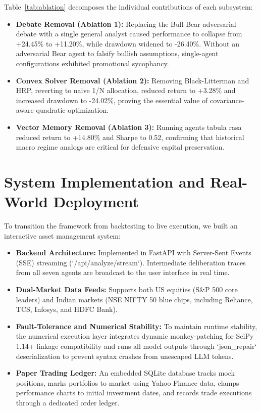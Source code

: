 \documentclass[conference]{IEEEtran}
\begin{document}
Table~\ref{tab:ablation} decomposes the individual contributions of each subsystem:
\begin{itemize}
    \item \textbf{Debate Removal (Ablation 1):} Replacing the Bull-Bear adversarial debate with a single general analyst caused performance to collapse from +24.45\% to +11.20\%, while drawdown widened to -26.40\%. Without an adversarial Bear agent to falsify bullish assumptions, single-agent configurations exhibited promotional sycophancy.
    \item \textbf{Convex Solver Removal (Ablation 2):} Removing Black-Litterman and HRP, reverting to naive 1/N allocation, reduced return to +3.28\% and increased drawdown to -24.02\%, proving the essential value of covariance-aware quadratic optimization.
    \item \textbf{Vector Memory Removal (Ablation 3):} Running agents tabula rasa reduced return to +14.80\% and Sharpe to 0.52, confirming that historical macro regime analogs are critical for defensive capital preservation.
\end{itemize}

\section{System Implementation and Real-World Deployment}

To transition the framework from backtesting to live execution, we built an interactive asset management system:
\begin{itemize}
    \item \textbf{Backend Architecture:} Implemented in FastAPI with Server-Sent Events (SSE) streaming (`/api/analyze/stream`). Intermediate deliberation traces from all seven agents are broadcast to the user interface in real time.
    \item \textbf{Dual-Market Data Feeds:} Supports both US equities (S\&P 500 core leaders) and Indian markets (NSE NIFTY 50 blue chips, including Reliance, TCS, Infosys, and HDFC Bank).
    \item \textbf{Fault-Tolerance and Numerical Stability:} To maintain runtime stability, the numerical execution layer integrates dynamic monkey-patching for SciPy 1.14+ linkage compatibility and runs all model outputs through `json\_repair` deserialization to prevent syntax crashes from unescaped LLM tokens.
    \item \textbf{Paper Trading Ledger:} An embedded SQLite database tracks mock positions, marks portfolios to market using Yahoo Finance data, clamps performance charts to initial investment dates, and records trade executions through a dedicated order ledger.
\end{itemize}
\end{document}
